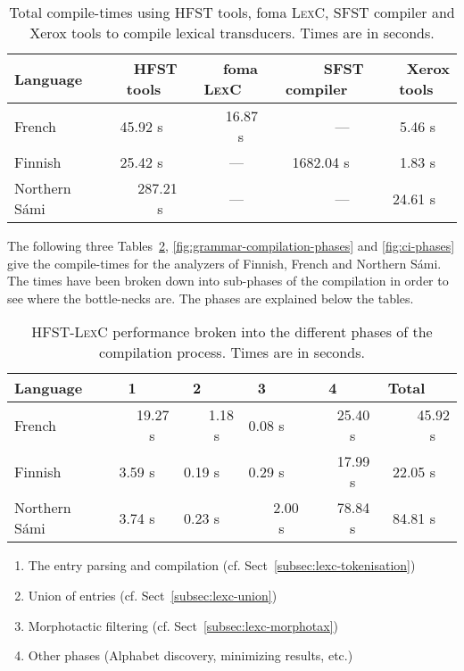\documentclass[postprint]{flammie}
\begin{document}
\begin{table}[!h]
  \begin{center}
    \begin{tabular}{l|r|r|r|r}
      \hline
      Language & ~~\textsc{HFST} tools~~ & ~~foma \textsc{LexC}~~ & ~~\textsc{SFST} compiler~~ & ~~Xerox tools~~ \\
      \hline
      French          & 45.92 s~~ & ~~16.87 s~~ & ---~~        & 5.46 s~~\\
      Finnish         & 25.42 s~~ & ---~~      & ~~1682.04 s~~ & 1.83 s~~\\
      Northern S\'ami~~ & ~~287.21 s~~ & ---~~      & ---~~        & ~~24.61 s~~\\
      \hline
    \end{tabular}
    \vskip0.5cm
    \caption{Total compile-times using \textsc{HFST} tools, foma
    \textsc{LexC}, \textsc{SFST} compiler and Xerox tools to compile
    lexical transducers. Times are in
    seconds.}\label{fig:lexicon-compilation-comparisons}
  \end{center}
\end{table}

The following three Tables~\ref{fig:lexicon-compilation-phases},
\ref{fig:grammar-compilation-phases} and \ref{fig:ci-phases} give the
 compile-times for the analyzers of Finnish, French and
Northern S\'ami. The times have been broken down into sub-phases of the
compilation in order to see where the bottle-necks are. The phases are
explained below the tables.

\begin{table}[!h]
  \begin{center}
    \begin{tabular}{l|rrrr|r}
      \hline
      Language        & 1~~~~     & 2~~~~     & 3~~~~     & 4~~~~     & Total~~~ \\
      \hline
      French          & ~~19.27 s~~ & ~~1.18 s~~ & 0.08 s~~ & ~~25.40 s~~ & ~~45.92 s~~ \\
      Finnish         & 3.59  s~~ & 0.19 s~~ & 0.29 s~~ & 17.99 s~~ & 22.05 s~~ \\
      Northern S\'ami~~ & 3.74  s~~ & 0.23 s~~ & ~~2.00 s~~ & 78.84 s~~ & 84.81 s~~ \\ 
      \hline
    \end{tabular}
    \vskip0.5cm
    \begin{enumerate}
    \item The entry parsing and compilation
    (cf. Sect~\ref{subsec:lexc-tokenisation})
    \item Union of entries (cf. Sect~\ref{subsec:lexc-union})
    \item Morphotactic filtering
    (cf. Sect~\ref{subsec:lexc-morphotax})
    \item Other phases (Alphabet discovery, minimizing results, etc.)
    \end{enumerate}
    \caption{\textsc{HFST-LexC} performance broken into the different
    phases of the compilation process. Times are in
    seconds.}\label{fig:lexicon-compilation-phases}
  \end{center}
\end{table}
\end{document}

